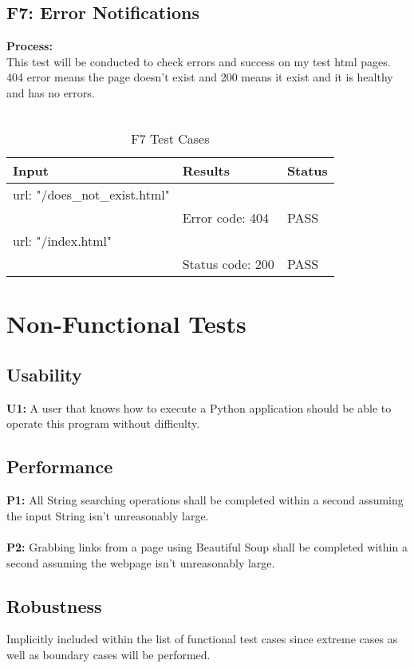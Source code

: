 \documentclass[12pt, titlepage]{article}
\begin{document}
\subsection{F7: Error Notifications}
\textbf{Process:}\\
This test will be conducted to check errors and success on my test html pages. 404 error means the page doesn't exist and 200 means it exist and it is healthy and has no errors. \\\
\begin{table}[h!]
\centering
\begin{tabular}{ p{7cm}  p{4cm}  p{4cm} }
	Input &Results & Status\\ \hline
	url: "/does\_not\_exist.html"\\
	& Error code: 404  & PASS\\ \hline
	url: "/index.html"\\
	 & Status code: 200 & PASS\\ \hline
\end{tabular}
\caption{F7 Test Cases}
\label{table:F7 Test Cases}
\end{table}

\section{Non-Functional Tests}
\subsection{Usability}
\textbf{U1:} A user that knows how to execute a Python application should be able to operate this program without difficulty.

\subsection{Performance}
\textbf{P1:} All String searching operations shall be completed within a second assuming the input String isn't unreasonably large.\\\\
\textbf{P2:} Grabbing links from a page using Beautiful Soup shall be completed within a second assuming the webpage isn't unreasonably large.
\subsection{Robustness}
Implicitly included within the list of functional test cases since extreme cases as well as boundary cases will be performed.
\end{document}
